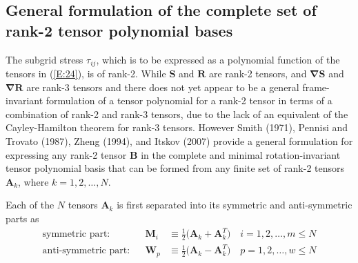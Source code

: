 \subsection{General formulation of the complete set of rank-2 tensor polynomial bases}
\label{sec:2A}

The subgrid stress $\tau_{ij}$, which is to be expressed as a polynomial function of the tensors in (\ref{E:24}), is of rank-2.  While $\mathbf{S}$ and $\mathbf{R}$ are rank-2 tensors,   and  $\mathbf{\nabla S}$ and $\mathbf{\nabla R}$ are rank-3 tensors and there does not yet appear to be a general frame-invariant formulation of a tensor polynomial for a rank-2 tensor in terms of a combination of rank-2 and rank-3 tensors, due to the lack of an equivalent of the Cayley-Hamilton theorem for rank-3 tensors.  However Smith (1971), Pennisi and Trovato (1987), Zheng (1994), and Itskov (2007) provide a general formulation for expressing any rank-2 tensor $\mathbf{B}$ in the complete and minimal rotation-invariant tensor polynomial basis that can be formed from any finite set of rank-2 tensors $\mathbf{A}_{k}$, where $k=1,2,\ldots,N$.

Each of the $N$ tensors $\mathbf{A}_{k}$ is first separated into its symmetric and anti-symmetric parts as
%
\begin{subequations}
\label{E:26}
\begin{align}
 	\text{symmetric part:} &&
	\mathbf{M}_{i} &\equiv \frac{1}{2} \big( \mathbf{A}_k + \mathbf{A}^T_k \big) \quad
	i = 1,2, \ldots, m \leq N \\
	\text{anti-symmetric part:} && 
	\mathbf{W}_{p} &\equiv \frac{1}{2} \big( \mathbf{A}_k - \mathbf{A}^T_k \big) \quad
	p = 1,2, \ldots, w \leq N 
\end{align}
\end{subequations}
%
%    

